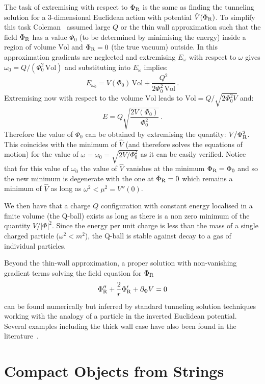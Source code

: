 \documentclass[11pt,a4paper]{article}
\newcommand{\be}{\begin{equation}}
\newcommand{\ee}{\end{equation}}
\begin{document}
The task of extremising with respect to $\Phi_{\rm R}$ is the same as finding the tunneling solution for a 3-dimensional Euclidean action with potential $\hat{V}(\Phi_{\rm R})$. To simplify this task Coleman~\cite{Coleman:1985ki} assumed large $Q$ or the thin wall approximation such that the field $\Phi_{\rm R}$ has a value $\Phi_0$ (to be determined by minimising the energy) inside a region of volume $\text{Vol}$ and $\Phi_{\rm R}=0$ (the true vacuum) outside. In this approximation gradients are neglected and extremising $E_\omega $ with respect to $\omega$ gives $\omega_0 = Q/(\Phi_0^2 \, \text{Vol})$ and substituting into $E_\omega$ implies:
\be
E_{\omega_0}=V(\Phi_0) \, \text{Vol}+\frac{Q^2}{2 \Phi_0^2 \, \text{Vol}} \,.
\ee
Extremising now with respect to the volume $\text{Vol}$ leads to $\text{Vol}=Q/\sqrt{2 \Phi_0^2 V}$ and:
\be
E=Q\sqrt{\frac{2 V(\Phi_0)}{\Phi_0^2}} \,.
\ee
Therefore the value of $\Phi_0$ can be obtained by extremising the quantity: $V/\Phi_{\rm R}^2$. This coincides with the minimum of $\hat{V}$  (and therefore solves the equations of motion) for the value of $\omega=\omega_0=\sqrt{2 V/\Phi_0^2}$ as it can be easily verified. Notice that for this value of $\omega_0$ the value of $\hat{V}$ vanishes at the minimum $\Phi_{\rm R}=\Phi_0$ and so the new minimum is degenerate with the one at $\Phi_{\rm R}=0$ which remains a minimum of $\hat{V}$ as long as $\omega^2< \mu^2=V''(0)$. 

We then have that a charge $Q$ configuration with constant energy localised in a finite volume (the Q-ball) exists as long as there is a non zero minimum of the quantity $V/|\Phi|^2$. Since the energy per unit charge is less than the mass of a single charged particle ($\omega^2< m^2$), the Q-ball is stable against decay to a gas of individual particles.

Beyond the thin-wall approximation, a proper solution with non-vanishing gradient terms solving the field equation for $\Phi_{\rm R}$
\be
\Phi_{\rm R}'' +\frac{2}{r}\Phi_{\rm R}'+ \partial_\Phi V = 0
\ee
can be found numerically but inferred by standard tunneling solution techniques working with the analogy of a particle in the inverted Euclidean potential. Several examples including the thick wall case have also been found in the literature~\cite{Kusenko:1997ad}.

\section{Compact Objects from Strings}
\label{sec:StringCOs}
\end{document}
